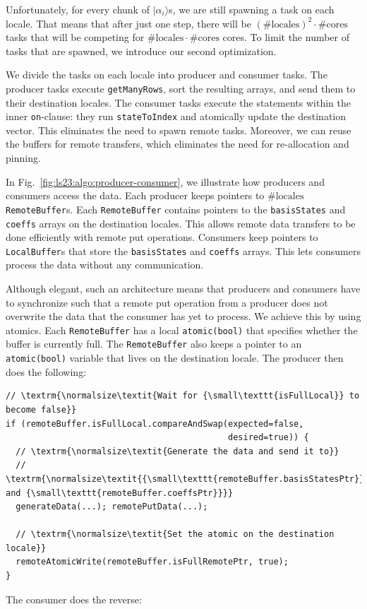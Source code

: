 Unfortunately, for every chunk of $|\alpha_i\rangle$s, we are still spawning a task on each locale. That means that after just one step, there will be $(\#\text{locales})^2 \cdot \#\text{cores}$ tasks that will be competing for $\#\text{locales} \cdot \#\text{cores}$ cores. To limit the number of tasks that are spawned, we introduce our second optimization.

We divide the tasks on each locale into producer and consumer tasks. The producer tasks execute \verb|getManyRows|, sort the resulting arrays, and send them to their destination locales. The consumer tasks execute the statements within the inner \verb|on|-clause: they run \verb|stateToIndex| and atomically update the destination vector. This eliminates the need to spawn remote tasks. Moreover, we can reuse the buffers for remote transfers, which eliminates the need for re-allocation and pinning.

In Fig.~\ref{fig:ls23:algo:producer-consumer}, we illustrate how producers and consumers access the data. Each producer keeps pointers to $\#\text{locales}$ \verb|RemoteBuffer|s. Each \verb|RemoteBuffer| contains pointers to the \verb|basisStates| and \verb|coeffs| arrays on the destination locales. This allows remote data transfers to be done efficiently with remote put operations. Consumers keep pointers to \verb|LocalBuffer|s that store the \verb|basisStates| and \verb|coeffs| arrays. This lets consumers process the data without any communication.

Although elegant, such an architecture means that producers and consumers have to synchronize such that a remote put operation from a producer does not overwrite the data that the consumer has yet to process. We achieve this by using atomics. Each \verb|RemoteBuffer| has a local \verb|atomic(bool)| that specifies whether the buffer is currently full. The \verb|RemoteBuffer| also keeps a pointer to an \verb|atomic(bool)| variable that lives on the destination locale. The producer then does the following:

\begin{verbatim}
// \textrm{\normalsize\textit{Wait for {\small\texttt{isFullLocal}} to become false}}
if (remoteBuffer.isFullLocal.compareAndSwap(expected=false,
                                            desired=true)) {
  // \textrm{\normalsize\textit{Generate the data and send it to}}
  // \textrm{\normalsize\textit{{\small\texttt{remoteBuffer.basisStatesPtr}} and {\small\texttt{remoteBuffer.coeffsPtr}}}}
  generateData(...); remotePutData(...);

  // \textrm{\normalsize\textit{Set the atomic on the destination locale}}
  remoteAtomicWrite(remoteBuffer.isFullRemotePtr, true);
}
\end{verbatim}
The consumer does the reverse:

